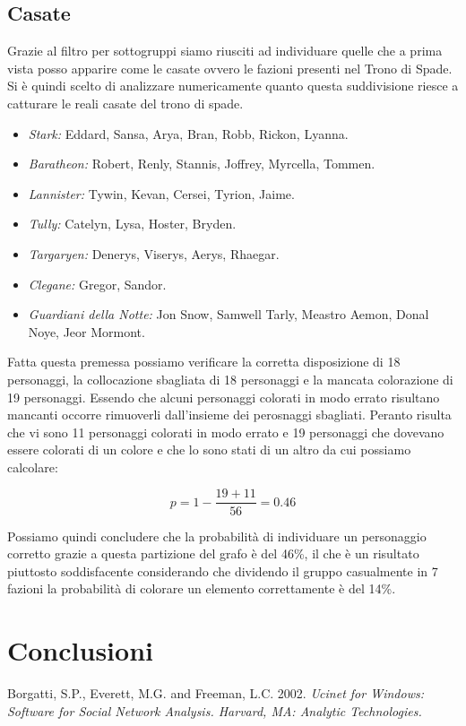 \documentclass[a4paper]{article}
\begin{document}
\subsection{Casate}
Grazie al filtro per sottogruppi siamo riusciti ad individuare quelle che a prima vista posso apparire come le casate ovvero le fazioni presenti nel Trono di Spade.\\
Si è quindi scelto di analizzare numericamente quanto questa suddivisione riesce a catturare le reali casate del trono di spade.
\begin{itemize}
  \item \emph{Stark:} Eddard, Sansa, Arya, Bran, Robb, Rickon, Lyanna.
  \item \emph{Baratheon:} Robert, Renly, Stannis, Joffrey, Myrcella, Tommen.
  \item \emph{Lannister:} Tywin, Kevan, Cersei, Tyrion, Jaime.
  \item \emph{Tully:} Catelyn, Lysa, Hoster, Bryden.
  \item \emph{Targaryen:} Denerys, Viserys, Aerys, Rhaegar.
  \item \emph{Clegane:} Gregor, Sandor.
  \item \emph{Guardiani della Notte:} Jon Snow, Samwell Tarly, Meastro Aemon, Donal Noye, Jeor Mormont.
\end{itemize}

Fatta questa premessa possiamo verificare la corretta disposizione di 18 personaggi, la collocazione sbagliata di 18 personaggi e la mancata colorazione di 19 personaggi. Essendo che alcuni personaggi colorati in modo errato risultano mancanti occorre rimuoverli dall'insieme dei perosnaggi sbagliati. Peranto risulta che vi sono 11 personaggi colorati in modo errato e 19 personaggi che dovevano essere colorati di un colore e che lo sono stati di un altro da cui possiamo calcolare:

\begin{displaymath}
	p=1-\frac{19+11}{56}=0.46    
\end{displaymath}

Possiamo quindi concludere che la probabilità di individuare un personaggio corretto grazie a questa partizione del grafo è del 46\%, il che è un risultato piuttosto soddisfacente considerando che dividendo il gruppo casualmente in 7 fazioni la probabilità di colorare un elemento correttamente è del 14\%.
\section{Conclusioni}

\begin{thebibliography}{9}
  	Borgatti, S.P., Everett, M.G. and Freeman, L.C. 2002. 		\emph{Ucinet for Windows: Software for Social Network Analysis. Harvard, MA: Analytic Technologies.} 
\end{thebibliography}
\end{document}
